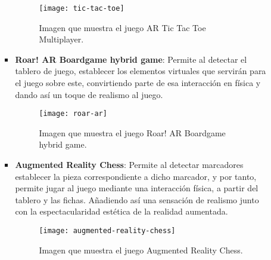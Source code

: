 \begin{itemize}
\begin{itemize}
\begin{itemize}
  \begin{figure}[h]
    \centering
    \texttt{[image: tic-tac-toe]}
    \caption{Imagen que muestra el juego AR Tic Tac Toe Multiplayer.\protect\footnotemark}
    \label{figura-tic-tac-toe}
  \end{figure}


  \newpage

  \item \textbf{Roar! AR Boardgame hybrid game}: Permite al detectar el tablero de juego, establecer los elementos virtuales que servirán para el juego sobre este, convirtiendo parte de esa interacción en física y dando así un toque de realismo al juego.

  \begin{figure}[h]
    \centering
    \texttt{[image: roar-ar]}
    \caption{Imagen que muestra el juego Roar! AR Boardgame hybrid game.\protect\footnotemark}
    \label{figura-roar-ar}
  \end{figure}


  \item \textbf{Augmented Reality Chess}: Permite al detectar marcadores establecer la pieza correspondiente a dicho marcador, y por tanto, permite jugar al juego mediante una interacción física, a partir del tablero y las fichas. Añadiendo así una sensación de realismo junto con la espectacularidad estética de la realidad aumentada.

  \begin{figure}[h]
    \centering
    \texttt{[image: augmented-reality-chess]}
    \caption{Imagen que muestra el juego Augmented Reality Chess.\protect\footnotemark}
    \label{figura-augmented-reality-chess}
  \end{figure}


\end{itemize}


\end{itemize}
\end{itemize}

